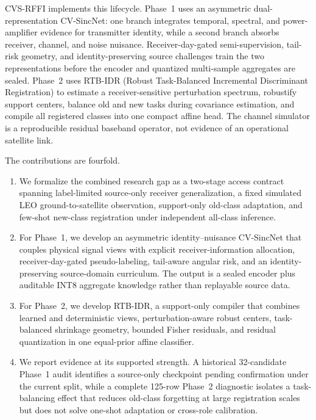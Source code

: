 \documentclass[journal]{IEEEtran}
\newcommand{\method}{CVS-RFFI}
\newcommand{\stagehead}{RTB-IDR}
\begin{document}
\method{} implements this lifecycle. Phase~1 uses an asymmetric dual-representation CV-SincNet: one branch integrates temporal, spectral, and power-amplifier evidence for transmitter identity, while a second branch absorbs receiver, channel, and noise nuisance. Receiver-day-gated semi-supervision, tail-risk geometry, and identity-preserving source challenges train the two representations before the encoder and quantized multi-sample aggregates are sealed. Phase~2 uses \stagehead{} (Robust Task-Balanced Incremental Discriminant Registration) to estimate a receiver-sensitive perturbation spectrum, robustify support centers, balance old and new tasks during covariance estimation, and compile all registered classes into one compact affine head. The channel simulator is a reproducible residual baseband operator, not evidence of an operational satellite link.

The contributions are fourfold.

\begin{enumerate}
  \item We formalize the combined research gap as a two-stage access contract spanning label-limited source-only receiver generalization, a fixed simulated LEO ground-to-satellite observation, support-only old-class adaptation, and few-shot new-class registration under independent all-class inference.
  \item For Phase~1, we develop an asymmetric identity--nuisance CV-SincNet that couples physical signal views with explicit receiver-information allocation, receiver-day-gated pseudo-labeling, tail-aware angular risk, and an identity-preserving source-domain curriculum. The output is a sealed encoder plus auditable INT8 aggregate knowledge rather than replayable source data.
  \item For Phase~2, we develop \stagehead{}, a support-only compiler that combines learned and deterministic views, perturbation-aware robust centers, task-balanced shrinkage geometry, bounded Fisher residuals, and residual quantization in one equal-prior affine classifier.
  \item We report evidence at its supported strength. A historical 32-candidate Phase~1 audit identifies a source-only checkpoint pending confirmation under the current split, while a complete 125-row Phase~2 diagnostic isolates a task-balancing effect that reduces old-class forgetting at large registration scales but does not solve one-shot adaptation or cross-role calibration.
\end{enumerate}
\end{document}
